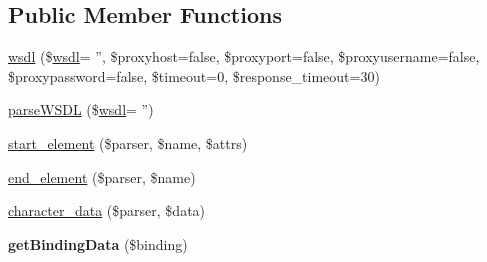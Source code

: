 \subsection*{Public Member Functions}
\begin{DoxyCompactItemize}
\item 
\hyperlink{classwsdl_a4afbbf2bb8e2267a6387b17eb41597aa}{wsdl} (\$\hyperlink{classwsdl}{wsdl}= '', \$proxyhost=false, \$proxyport=false, \$proxyusername=false, \$proxypassword=false, \$timeout=0, \$response\-\_\-timeout=30)
\item 
\hyperlink{classwsdl_aef0643f32c7dca703065cc3eb3fd1dba}{parse\-W\-S\-D\-L} (\$\hyperlink{classwsdl}{wsdl}= '')
\item 
\hyperlink{classwsdl_abf9dc4b028eeac08eeca4c7309a950e2}{start\-\_\-element} (\$parser, \$name, \$attrs)
\item 
\hyperlink{classwsdl_ad45367c512cbc2d4679d1a49db3802f2}{end\-\_\-element} (\$parser, \$name)
\item 
\hyperlink{classwsdl_a592a4f9b601cc33f15de0ad7a9c49ae5}{character\-\_\-data} (\$parser, \$data)
\item 
\hypertarget{classwsdl_ae6385888eeb57e98ef81323b05842341}{{\bfseries get\-Binding\-Data} (\$binding)}\label{classwsdl_ae6385888eeb57e98ef81323b05842341}


\end{DoxyCompactItemize}

